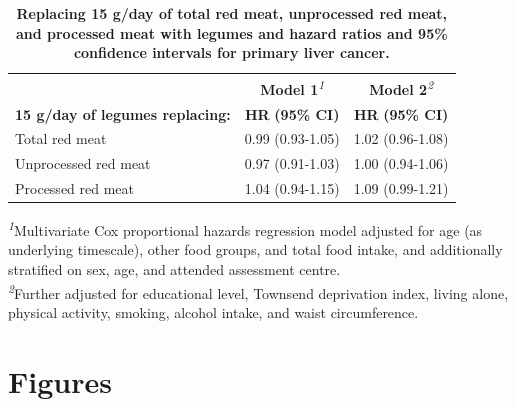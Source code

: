 \documentclass[
]{article}
\begin{document}
\begin{table}[h]
\caption{\label{tab:main}\textbf{Replacing 15 g/day of total red meat, unprocessed red meat, and processed meat with legumes and hazard ratios and 95\% confidence intervals for primary liver cancer.}} 
\fontsize{9.0pt}{10.8pt}\selectfont
\begin{tabular*}{1\linewidth}{@{\extracolsep{\fill}}lcc}
\toprule
 & {\bfseries \textbf{Model 1}}\textsuperscript{\textit{1}} & {\bfseries \textbf{Model 2}}\textsuperscript{\textit{2}} \\ 
\cmidrule(lr){2-2} \cmidrule(lr){3-3}
\textbf{15 g/day of legumes replacing:} & \textbf{HR} \textbf{(95\% CI)} & \textbf{HR} \textbf{(95\% CI)} \\ 
\midrule\addlinespace[2.5pt]
Total red meat & 0.99 (0.93-1.05) & 1.02 (0.96-1.08) \\ 
Unprocessed red meat & 0.97 (0.91-1.03) & 1.00 (0.94-1.06) \\ 
Processed red meat & 1.04 (0.94-1.15) & 1.09 (0.99-1.21) \\ 
\bottomrule
\end{tabular*}
\begin{minipage}{\linewidth}
\textsuperscript{\textit{1}}Multivariate Cox proportional hazards regression model adjusted for age (as underlying timescale), other food groups, and total food intake, and additionally stratified on sex, age, and attended assessment centre.\\
\textsuperscript{\textit{2}}Further adjusted for educational level, Townsend deprivation index, living alone, physical activity, smoking, alcohol intake, and waist circumference.\\
\end{minipage}
\end{table}

\clearpage

\hypertarget{sec8}{%
\section{Figures}\label{sec8}}
\end{document}
